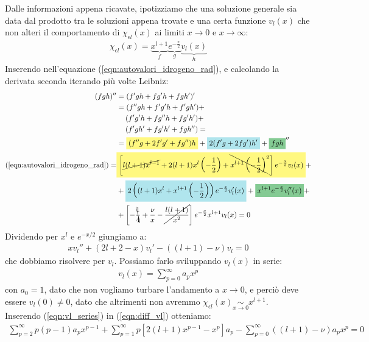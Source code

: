 \documentclass[../../FisicaTeorica.tex]{subfiles}
\begin{document}
Dalle informazioni appena ricavate, ipotizziamo che una soluzione generale sia data dal prodotto tra le soluzioni  appena trovate e una certa funzione $v_l(x)$ che non alteri il comportamento di $\chi_{\epsilon l}(x)$ ai limiti $x\to 0$ e $x\to \infty$:
\begin{align*}
\chi_{\epsilon l}(x) = \underbrace{x^{l+1} }_{f}\underbrace{e^{-\frac{x}{2}}}_{g} \underbrace{v_l(x)}_{h}
\end{align*}
Inserendo nell'equazione (\ref{eqn:autovalori_idrogeno_rad}), e calcolando la derivata seconda iterando più volte Leibniz:
\begin{align*}
(fgh)'' &=(f'gh + fg'h + fgh')' \\
&= (f'' g h + f'g'h + f'gh')  +\\
&\quad\>(f'g'h + fg''h+fg'h') +\\
&\quad\>(f'gh' + fg'h' + fgh'') =\\
&= \hlc{Yellow}{(f''g + 2f'g' + fg'')h} + \hlc{SkyBlue}{2(f'g + 2fg')h' }+ \hlc{ForestGreen}{fgh}''\\
(\ref{eqn:autovalori_idrogeno_rad}) =
&\hlc{Yellow}{\left[\cancel{l(l+1)x^{l-1} }+ 2(l+1)x^l\left(-\frac{1}{2}\right)
+ \bcancel{x^{l+1}\left(-\frac{1}{2}\right)^2} \right] e^{-\frac{x}{2}}v_l(x)} +\\
& +\hlc{SkyBlue}{ 2\left((l+1)x^l +x^{l+1}\left(-\frac{1}{2}\right) \right ) e^{-\frac{x}{2}} v_l'(x)} + \hlc{ForestGreen}{x^{l+1} e^{-\frac{x}{2}} v_l''(x)}+\\
&+ \left[-\bcancel{\frac{1}{4}} + \frac{\nu}{x} -\cancel{\frac{l(l+1)}{x^2}} \right] e^{-\frac{x}{2}} x^{l+1}v_l(x) = 0 
\end{align*}
Dividendo per $x^l$ e $e^{-x/2}$ giungiamo a:
\begin{align}
xv_l'' + (2l+2-x)v_l' - \left((l+1)-\nu\right)v_l = 0
\label{eqn:diff_vl}
\end{align}
che dobbiamo risolvere per $v_l$. Possiamo farlo sviluppando $v_l(x)$ in serie:
\begin{align}
v_l(x) = \sum_{p=0}^{\infty} a_p x^p
\label{eqn:vl_series}
\end{align}
con $a_0 = 1$, dato che non vogliamo turbare l'andamento a $x\to 0$, e perciò deve essere $v_l(0) \neq 0$, dato che altrimenti non avremmo $\chi_{\epsilon l}(x) \underset{x\to 0}{\sim}x^{l+1}$.\\
Inserendo (\ref{eqn:vl_series}) in (\ref{eqn:diff_vl}) otteniamo:
\begin{align*}
\sum_{p=2}^\infty p(p-1) a_p x^{p-1} + \sum_{p=1}^\infty p[2(l+1)x^{p-1}-x^p]a_p -\sum_{p=0}^\infty ((l+1)-\nu) a_p x^p = 0
\end{align*}
\end{document}
